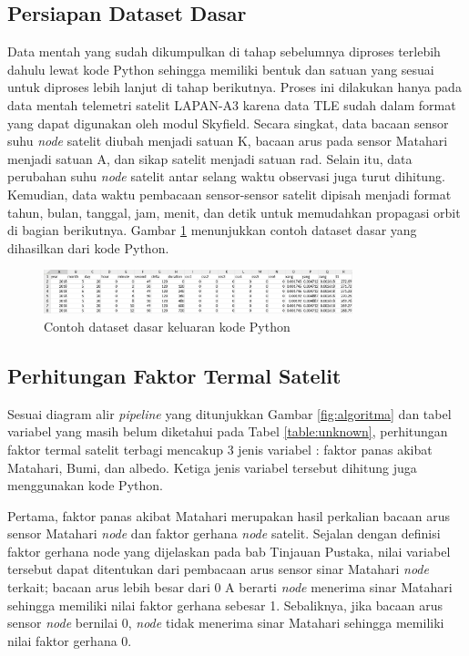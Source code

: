 \subsection{Persiapan Dataset Dasar}

Data mentah yang sudah dikumpulkan di tahap sebelumnya diproses terlebih dahulu
lewat kode Python sehingga memiliki bentuk dan satuan yang sesuai untuk
diproses lebih lanjut di tahap berikutnya. Proses ini dilakukan hanya pada data
mentah telemetri satelit LAPAN-A3 karena data TLE sudah dalam format yang dapat
digunakan oleh modul Skyfield. Secara singkat, data bacaan sensor suhu
\textit{node} satelit diubah menjadi satuan K, bacaan arus pada sensor Matahari
menjadi satuan A, dan sikap satelit menjadi satuan rad. Selain itu, data
perubahan suhu \textit{node} satelit antar selang waktu observasi juga turut
dihitung. Kemudian, data waktu pembacaan sensor-sensor satelit dipisah menjadi
format tahun, bulan, tanggal, jam, menit, dan detik untuk memudahkan propagasi
orbit di bagian berikutnya. Gambar \ref{fig:basedataset} menunjukkan
contoh dataset dasar yang dihasilkan dari kode Python.

\begin{figure}[H]
\setlength{}
\begin{center}
\includegraphics[width=0.8\textwidth]{fig/basedataset.png}
\caption{Contoh dataset dasar keluaran kode Python}
\label{fig:basedataset}
\end{center}
\end{figure}

\subsection{Perhitungan Faktor Termal Satelit}

Sesuai diagram alir \textit{pipeline} yang ditunjukkan Gambar
\ref{fig:algoritma} dan tabel variabel yang masih belum diketahui pada Tabel
\ref{table:unknown}, perhitungan faktor termal satelit terbagi mencakup 3 jenis
variabel : faktor panas akibat Matahari, Bumi, dan albedo. Ketiga jenis
variabel tersebut dihitung juga menggunakan kode Python. 

Pertama, faktor panas akibat Matahari merupakan hasil perkalian bacaan arus
sensor Matahari \textit{node} dan faktor gerhana \textit{node} satelit. Sejalan
dengan definisi faktor gerhana node yang dijelaskan pada bab Tinjauan Pustaka,
nilai variabel tersebut dapat ditentukan dari pembacaan arus sensor sinar
Matahari \textit{node} terkait; bacaan arus lebih besar dari 0 A berarti
\textit{node} menerima sinar Matahari sehingga memiliki nilai faktor gerhana
sebesar 1. Sebaliknya, jika bacaan arus sensor \textit{node} bernilai 0,
\textit{node} tidak menerima sinar Matahari sehingga memiliki nilai faktor
gerhana 0.

